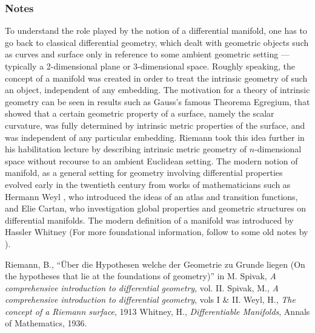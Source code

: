 \documentclass[12pt]{article}
\begin{document}
 \subsubsection{Notes} 
To understand the role played by the notion of a
 differential manifold, one has to go back to classical differential
 geometry, which dealt with geometric objects such as curves and
 surface only in reference to some ambient geometric setting ---
 typically a 2-dimensional plane or 3-dimensional space. Roughly
 speaking, the concept of a manifold was created in order to treat the
 intrinsic geometry of such an object, independent of any embedding.
 The motivation for a theory of intrinsic geometry can be seen in
 results such as Gauss's famous Theorema Egregium, that showed that a
 certain geometric property of a surface, namely the scalar
 curvature, was fully determined by intrinsic metric properties of the
 surface, and was independent of any particular embedding. Riemann 
\cite{riemann}
 took this idea further in his habilitation lecture by describing
 intrinsic metric geometry of $n$-dimensional space without recourse to
 an ambient Euclidean setting. The modern notion of manifold, as a
 general setting for geometry involving differential properties evolved
 early in the twentieth century from works of mathematicians such as
 Hermann Weyl \cite{weyl}, who introduced the ideas of an atlas and transition
 functions, and Elie Cartan, who investigation global properties and
 geometric structures on differential manifolds. The modern definition
 of a manifold was introduced by Hassler Whitney \cite{whitney}
 (For more foundational information, follow  to some old notes by  ).
 
\begin{thebibliography}{9}
 Riemann, B., ``\"Uber die Hypothesen welche der Geometrie zu
 Grunde liegen
 (On the hypotheses that lie at the foundations of geometry)'' in
 M. Spivak, {\em A comprehensive introduction to differential
 geometry}, vol. II.
  Spivak, M., {\em A comprehensive introduction to
 differential  geometry}, vols I \& II.
  Weyl, H., {\em The concept of a Riemann surface}, 1913
  Whitney, H., \emph{Differentiable Manifolds}, Annals of
 Mathematics, 1936.
 \end{thebibliography}

\end{document}
